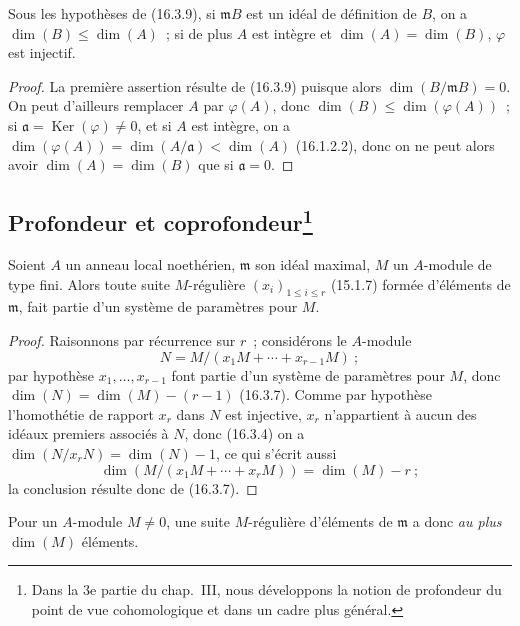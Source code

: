 \begin{corollary}[16.3.10]
\label{0.16.3.10-fr}
Sous les hypothèses de (16.3.9), si $\mathfrak{m}B$ est un idéal de définition
de $B$, on a $\dim(B)\leq\dim(A)$~; si de plus $A$ est intègre et
$\dim(A)=\dim(B)$, $\varphi$ est injectif.
\end{corollary}

\begin{proof}
La première assertion résulte de (16.3.9) puisque alors
$\dim(B/\mathfrak{m}B)=0$. On peut d'ailleurs remplacer $A$ par
$\varphi(A)$, donc $\dim(B)\leq\dim(\varphi(A))$~; si
$\mathfrak{a}=\operatorname{Ker}(\varphi)\neq0$, et si $A$ est intègre, on a
$\dim(\varphi(A))=\dim(A/\mathfrak{a})<\dim(A)$ (16.1.2.2), donc on ne peut
alors avoir $\dim(A)=\dim(B)$ que si $\mathfrak{a}=0$.
\end{proof}

\subsection[Profondeur et coprofondeur]{Profondeur et
coprofondeur\protect\footnote{Dans la 3e partie du chap.~III, nous développons
la notion de profondeur du point de vue cohomologique et dans un cadre plus
général.}}
\label{subsection:0.16.4-fr}

\begin{proposition}[16.4.1]
\label{0.16.4.1-fr}
Soient $A$ un anneau local noethérien, $\mathfrak{m}$ son idéal maximal, $M$ un
$A$-module de type fini. Alors toute suite $M$-régulière
$(x_i)_{1\leq i\leq r}$ (15.1.7) formée d'éléments de $\mathfrak{m}$, fait
partie d'un système de paramètres pour $M$.
\end{proposition}

\begin{proof}
Raisonnons par récurrence sur $r$~; considérons le $A$-module
\[
  N=M/(x_1M+\cdots+x_{r-1}M)~;
\]
par hypothèse $x_1,\ldots,x_{r-1}$ font partie d'un système de paramètres pour
$M$, donc $\dim(N)=\dim(M)-(r-1)$ (16.3.7). Comme par hypothèse l'homothétie
de rapport $x_r$ dans $N$ est injective, $x_r$ n'appartient à aucun des idéaux
premiers associés à $N$, donc (16.3.4) on a
$\dim(N/x_rN)=\dim(N)-1$, ce qui s'écrit aussi
\[
  \dim(M/(x_1M+\cdots+x_rM))=\dim(M)-r~;
\]
la conclusion résulte donc de (16.3.7).
\end{proof}

Pour un $A$-module $M\neq0$, une suite $M$-régulière d'éléments de
$\mathfrak{m}$ a donc \emph{au plus} $\dim(M)$ éléments.


